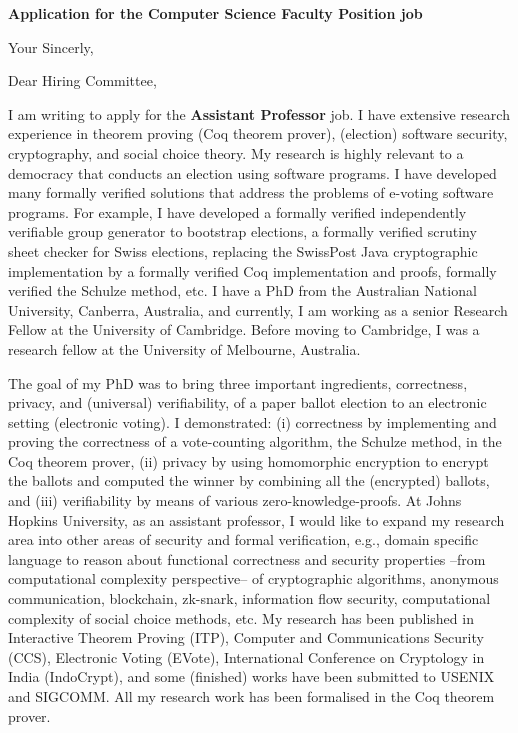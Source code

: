 \documentclass[11pt,a4paper,roman]{moderncv}
\begin{document}
\date{}
\opening{\textbf{Application for the Computer Science Faculty Position job}}
\closing{Your Sincerly, \vspace{-1em}}



\makelettertitle

Dear Hiring Committee, 

I am writing to apply
for the \textbf{Assistant Professor} job. 
I have extensive research experience in
theorem proving (Coq theorem prover), (election) software security, cryptography,  
and social choice theory. My research is highly relevant to a democracy that conducts 
an election using software programs. I have developed many formally verified 
solutions that address the problems
of e-voting software programs. 
For example, I have developed a formally verified independently 
verifiable group generator to bootstrap elections, a formally verified 
scrutiny sheet checker for Swiss elections, replacing the SwissPost Java 
cryptographic implementation by a formally verified Coq implementation and proofs,  
formally verified the Schulze method, etc.
I have a PhD from the Australian National University, Canberra, Australia,
and currently, I am working as a senior Research Fellow at the University of 
Cambridge. Before moving to Cambridge, I was a 
research fellow at the University of Melbourne, Australia.



The goal of my PhD was to 
bring  three important ingredients, correctness, privacy, and (universal) verifiability, of a 
paper ballot election to an electronic setting (electronic voting). I 
demonstrated: (i) correctness by implementing and proving the correctness of 
a vote-counting algorithm, the Schulze method, in the Coq theorem prover, 
(ii) privacy by using homomorphic encryption to encrypt the ballots and computed
the winner by combining all the (encrypted) ballots, and 
(iii) verifiability by means of various zero-knowledge-proofs.
At Johns Hopkins University, as an assistant professor, 
I would like to expand my research area into other areas of 
security and formal verification, e.g., domain specific language to reason about 
functional correctness and security properties --from computational complexity perspective-- of 
cryptographic algorithms, anonymous communication, blockchain, zk-snark,  
information flow security, computational complexity of social choice methods, 
etc. My research has been published in Interactive Theorem Proving (ITP), 
Computer and Communications Security (CCS), Electronic Voting (EVote), 
International Conference on Cryptology in India (IndoCrypt),
and some (finished) works have been submitted to USENIX and SIGCOMM. 
All my research work has been formalised in the Coq theorem prover. 
\end{document}
